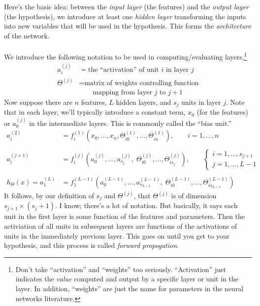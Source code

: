 \documentclass[12pt]{article}
\begin{document}
Here's the basic idea:
between the \emph{input layer} (the features) and the 
\emph{output layer} (the hypothesis), we introduce at least one
\emph{hidden layer} transforming the inputs into new variables 
that will be used in the hypothesis. This forms the 
\emph{architecture} of the network.
\\
\\
We introduce the following notation to be used in computing/evaluating
layers,\footnote{ 
Don't take ``activation'' and ``weights'' too seriously.  ``Activation''
just indicates the \emph{value} computed and output by a specific
layer or unit in the layer. In addition, ``weights'' are just
the name for parameters in the neural networks literature.}
\begin{align*}
   a^{(j)}_i &= \text{the ``activation'' of unit $i$ in layer $j$} \\
   \Theta^{(j)} &= \text{matrix of weights controlling function}\\
   &\qquad \text{mapping from layer $j$ to $j+1$}
\end{align*}
Now suppose there are $n$ features, $L$ hidden layers, and $s_j$
units in layer $j$. Note that in each layer, we'll typically introduce 
a constant term, $x_0$ (for the features) or $a^{(j)}_0$ in
the intermediate layers. This is commonly called the ``bias unit.''
\begin{align*}
   a^{(2)}_i &= f^{(1)}_i\left(x_0, \ldots, x_n,
      \Theta_{i0}^{(1)},\ldots,\Theta_{in}^{(1)}\right), \qquad
      i=1,\ldots,n 
   \\	\\
   a^{(j+1)}_i &= f^{(j)}_i\left(a_0^{(j)}, \ldots, 
      a_{s_j}^{(j)}, \;
      \Theta_{i0}^{(j)},\ldots,\Theta_{is_j}^{(j)}\right), \qquad
      \begin{cases}
	 i=1,\ldots,s_{j+1} \\  j = 1, \ldots, L-1 \end{cases}
      \\
      \\
   h_\Theta(x) = 
      a^{(L)}_1 &= f^{(L-1)}_1\left(a_0^{(L-1)}, 
      \ldots, 
      a_{s_{L-1}}^{(L-1)}, \;
      \Theta_{i0}^{(L-1)},\ldots,\Theta_{is_{L-1}}^{(L-1)}
      \right)
\end{align*}
It follows, by our definition of $s_j$ and $\Theta^{(j)}$, that
$\Theta^{(j)}$ is of dimension $s_{j+1} \times (s_j + 1)$.
I know; there's a lot of notation. But basically, it says each unit
in the first layer is some function of the features and parameters.
Then the activiation of all units in subsequent layers are functions of 
the activations of units in the immediately previous layer. This
goes on until you get to your hypothesis, and this process is called 
\emph{forward propogation}.
\end{document}
